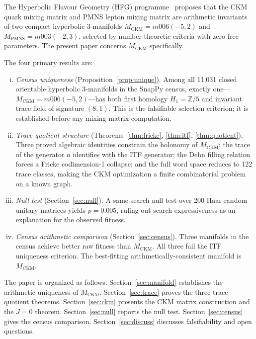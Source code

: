 \documentclass[11pt,a4paper]{article}
\theoremstyle{remark}
\newcommand{\MCKM}{M_{\mathrm{CKM}}}
\newcommand{\MPMNS}{M_{\mathrm{PMNS}}}
\newcommand{\Zfive}{\mathbb{Z}/5}
\begin{document}
The Hyperbolic Flavour Geometry (HFG) programme~\cite{Gentry:Unified}
proposes that the CKM quark mixing matrix and PMNS lepton mixing matrix
are arithmetic invariants of two compact hyperbolic 3-manifolds
$\MCKM = m006(-5,2)$ and $\MPMNS = m003(-2,3)$, selected by
number-theoretic criteria with zero free parameters.
The present paper concerns $\MCKM$ specifically.

The four primary results are:
\begin{enumerate}[(i)]
\item \emph{Census uniqueness} (Proposition~\ref{prop:unique}).
  Among all 11,031 closed orientable hyperbolic 3-manifolds in the
  SnapPy census, exactly one---$\MCKM = m006(-5,2)$---has both
  first homology $H_1 = \Zfive$ and invariant trace field of
  signature $(8,1)$.
  This is the falsifiable selection criterion; it is established
  before any mixing matrix computation.

\item \emph{Trace quotient structure} (Theorems~\ref{thm:fricke},
  \ref{thm:itf}, \ref{thm:quotient}).
  Three proved algebraic identities constrain the holonomy of $\MCKM$:
  the trace of the generator $a$ identifies with the ITF generator;
  the Dehn filling relation forces a Fricke codimension-1 collapse;
  and the full word space reduces to 122 trace classes, making the
  CKM optimization a finite combinatorial problem on a known graph.

\item \emph{Null test} (Section~\ref{sec:null}).
  A same-search null test over 200 Haar-random unitary matrices yields
  $p = 0.005$, ruling out search-expressiveness as an explanation
  for the observed fitness.

\item \emph{Census arithmetic comparison} (Section~\ref{sec:census}).
  Three manifolds in the census achieve better raw fitness than $\MCKM$.
  All three fail the ITF uniqueness criterion.
  The best-fitting arithmetically-consistent manifold is $\MCKM$.
\end{enumerate}

The paper is organized as follows.
Section~\ref{sec:manifold} establishes the arithmetic uniqueness of
$\MCKM$.
Section~\ref{sec:trace} proves the three trace quotient theorems.
Section~\ref{sec:ckm} presents the CKM matrix construction and the
$J=0$ theorem.
Section~\ref{sec:null} reports the null test.
Section~\ref{sec:census} gives the census comparison.
Section~\ref{sec:discuss} discusses falsifiability and open questions.
\end{document}
